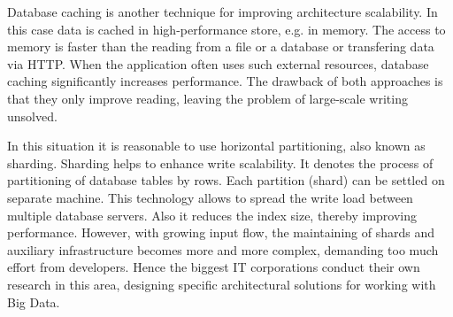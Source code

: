 Database caching is another technique for improving architecture scalability. 
In this case data is cached in high-performance store, e.g. in memory.
The access to memory is faster than the reading from a file or a database or transfering data via HTTP.
When the application often uses such external resources, database caching significantly increases performance. 
The drawback of both approaches is that they only improve reading, leaving the problem of large-scale writing unsolved. 

In this situation it is reasonable to use horizontal partitioning, also known as sharding.
Sharding helps to enhance write scalability.
It denotes the process of partitioning of database tables by rows.
Each partition (shard) can be settled on separate machine.
This technology allows to spread the write load between multiple database servers.
Also it reduces the index size, thereby improving performance.
However, with growing input flow, the maintaining of shards and auxiliary infrastructure becomes more and more complex, demanding too much effort from developers. 	   
Hence the biggest IT corporations conduct their own research in this area, designing specific architectural solutions for working with Big Data.